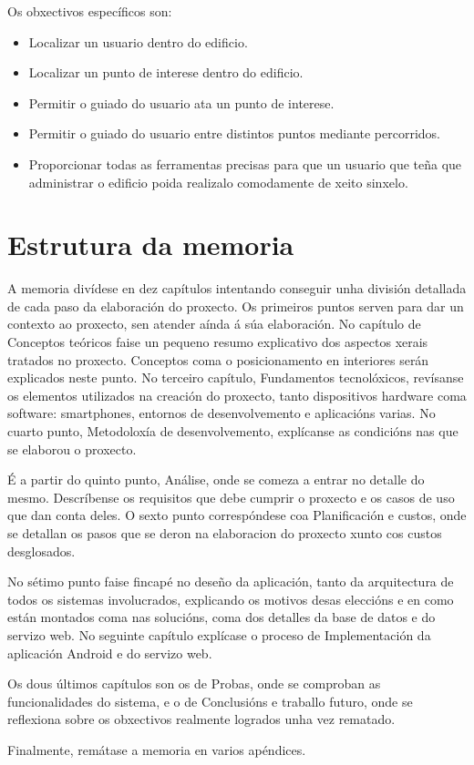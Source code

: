 Os obxectivos específicos son:
\begin{itemize}
	\item Localizar un usuario dentro do edificio.
	\item Localizar un punto de interese dentro do edificio.
	\item Permitir o guiado do usuario ata un punto de interese.
	\item Permitir o guiado do usuario entre distintos puntos mediante percorridos.
	\item Proporcionar todas as ferramentas precisas para que un usuario que teña que administrar o edificio poida realizalo comodamente de xeito sinxelo.
\end{itemize}

\section{Estrutura da memoria}

A memoria divídese en dez capítulos intentando conseguir unha división detallada de cada paso da elaboración do proxecto. Os primeiros puntos serven para dar un contexto ao proxecto, sen atender aínda á súa elaboración. No capítulo de Conceptos teóricos faise un pequeno resumo explicativo dos aspectos xerais tratados no proxecto. Conceptos coma o posicionamento en interiores serán explicados neste punto. No terceiro capítulo, Fundamentos tecnolóxicos, revísanse os elementos utilizados na creación do proxecto, tanto dispositivos hardware coma software: smartphones, entornos de desenvolvemento e aplicacións varias. No cuarto punto, Metodoloxía de desenvolvemento, explícanse as condicións nas que se elaborou o proxecto.

É a partir do quinto punto, Análise, onde se comeza a entrar no detalle do mesmo. Descríbense os requisitos que debe cumprir o proxecto e os casos de uso que dan conta deles. O sexto punto correspóndese coa Planificación e custos, onde se detallan os pasos que se deron na elaboracion do proxecto xunto cos custos desglosados.

No sétimo punto faise fincapé no deseño da aplicación, tanto da arquitectura de todos os sistemas involucrados, explicando os motivos desas eleccións e en como están montados coma nas solucións, coma dos detalles da base de datos e do servizo web.
No seguinte capítulo explícase o proceso de Implementación da aplicación Android e do servizo web.

Os dous últimos capítulos son os de Probas, onde se comproban as funcionalidades do sistema, e o de Conclusións e traballo futuro, onde se reflexiona sobre os obxectivos realmente logrados unha vez rematado.

Finalmente, remátase a memoria en varios apéndices.
